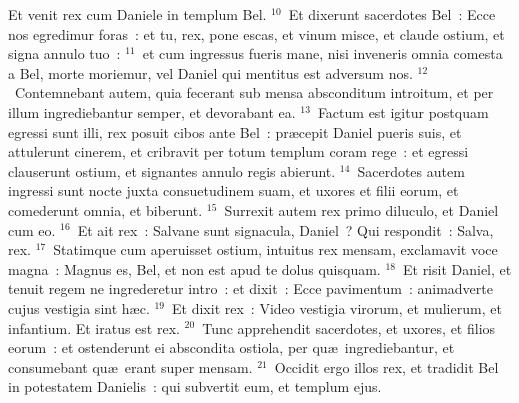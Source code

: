  Et venit rex cum Daniele in templum Bel.
${}^{10}$~Et dixerunt sacerdotes Bel~: Ecce nos egredimur foras~: et tu, rex, pone escas, et vinum misce, et claude ostium, et signa annulo tuo~:
${}^{11}$~et cum ingressus fueris mane, nisi inveneris omnia comesta a Bel, morte moriemur, vel Daniel qui mentitus est adversum nos.
${}^{12}$~Contemnebant autem, quia fecerant sub mensa absconditum introitum, et per illum ingrediebantur semper, et devorabant ea.
${}^{13}$~Factum est igitur postquam egressi sunt illi, rex posuit cibos ante Bel~: pr\ae cepit Daniel pueris suis, et attulerunt cinerem, et cribravit per totum templum coram rege~: et egressi clauserunt ostium, et signantes annulo regis abierunt.
${}^{14}$~Sacerdotes autem ingressi sunt nocte juxta consuetudinem suam, et uxores et filii eorum, et comederunt omnia, et biberunt.
${}^{15}$~Surrexit autem rex primo diluculo, et Daniel cum eo.
${}^{16}$~Et ait rex~: Salvane sunt signacula, Daniel~? Qui respondit~: Salva, rex.
${}^{17}$~Statimque cum aperuisset ostium, intuitus rex mensam, exclamavit voce magna~: Magnus es, Bel, et non est apud te dolus quisquam.
${}^{18}$~Et risit Daniel, et tenuit regem ne ingrederetur intro~: et dixit~: Ecce pavimentum~: animadverte cujus vestigia sint h\ae c.
${}^{19}$~Et dixit rex~: Video vestigia virorum, et mulierum, et infantium. Et iratus est rex.
${}^{20}$~Tunc apprehendit sacerdotes, et uxores, et filios eorum~: et ostenderunt ei abscondita ostiola, per qu\ae\ ingrediebantur, et consumebant qu\ae\ erant super mensam.
${}^{21}$~Occidit ergo illos rex, et tradidit Bel in potestatem Danielis~: qui subvertit eum, et templum ejus.


